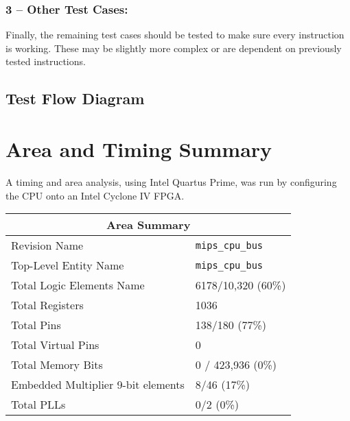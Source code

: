 \documentclass{article}
\begin{document}
\subsubsection{3 – Other Test Cases:}
Finally, the remaining test cases should be tested to make sure every instruction is working. These may be slightly more complex or are dependent on previously tested instructions.
\hfill \break
\hfill \break

\subsection{Test Flow Diagram}

\begin{figure} [!htb]
    \centering
    \qquad

    \label{fig:example}%
\end{figure}


\section{Area and Timing Summary} 

A timing and area analysis, using Intel Quartus Prime, was run by configuring the CPU onto an Intel Cyclone IV FPGA. 

\hfill \break

\begin{tabular}[htp!]{ |p{5.95cm}|p{5.95cm}|}
\hline
\multicolumn{2}{|c|}{Area Summary} \\
\hline
Revision Name & \texttt{mips\_cpu\_bus}  \\
Top-Level Entity Name & \texttt{mips\_cpu\_bus} \\
Total Logic Elements Name & 6178/10,320 (60\%)  \\
Total Registers & 1036 \\
Total Pins & 138/180 (77\%) \\
Total Virtual Pins & 0  \\
Total Memory Bits & 0 / 423,936 (0\%) \\
Embedded Multiplier 9-bit elements & 8/46 (17\%)\\
Total PLLs & 0/2 (0\%)  \\
\hline
\end{tabular}

\hfill \break
\end{document}
